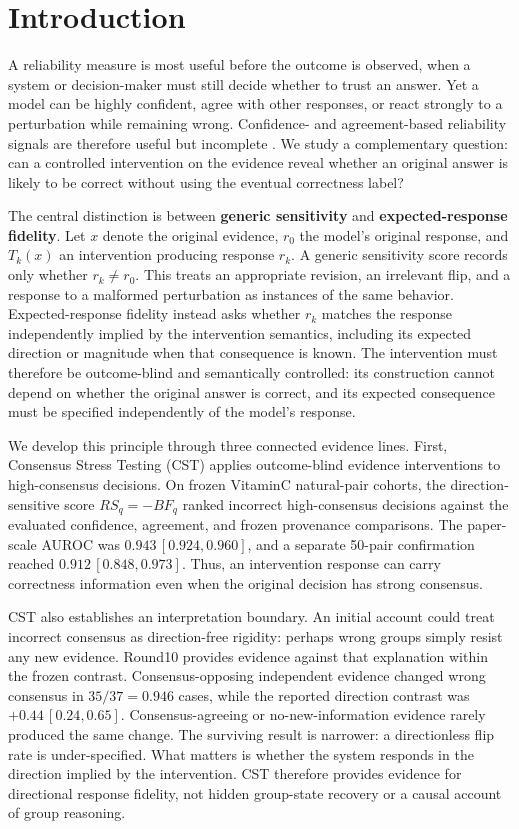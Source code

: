 \documentclass[11pt]{article}
\begin{document}
\section{Introduction}

A reliability measure is most useful before the outcome is observed, when a system or decision-maker must still decide whether to trust an answer. Yet a model can be highly confident, agree with other responses, or react strongly to a perturbation while remaining wrong. Confidence- and agreement-based reliability signals are therefore useful but incomplete \citep{guo-etal-2017-calibration,wang-etal-2022-self-consistency,kuhn-etal-2023-semantic-uncertainty}. We study a complementary question: can a controlled intervention on the evidence reveal whether an original answer is likely to be correct without using the eventual correctness label?

The central distinction is between \textbf{generic sensitivity} and \textbf{expected-response fidelity}. Let \(x\) denote the original evidence, \(r_0\) the model's original response, and \(T_k(x)\) an intervention producing response \(r_k\). A generic sensitivity score records only whether \(r_k\neq r_0\). This treats an appropriate revision, an irrelevant flip, and a response to a malformed perturbation as instances of the same behavior. Expected-response fidelity instead asks whether \(r_k\) matches the response independently implied by the intervention semantics, including its expected direction or magnitude when that consequence is known. The intervention must therefore be outcome-blind and semantically controlled: its construction cannot depend on whether the original answer is correct, and its expected consequence must be specified independently of the model's response.

We develop this principle through three connected evidence lines. First, Consensus Stress Testing (CST) applies outcome-blind evidence interventions to high-consensus decisions. On frozen VitaminC natural-pair cohorts, the direction-sensitive score \(RS_q=-BF_q\) ranked incorrect high-consensus decisions against the evaluated confidence, agreement, and frozen provenance comparisons. The paper-scale AUROC was \(0.943\,[0.924,0.960]\), and a separate 50-pair confirmation reached \(0.912\,[0.848,0.973]\). Thus, an intervention response can carry correctness information even when the original decision has strong consensus.

CST also establishes an interpretation boundary. An initial account could treat incorrect consensus as direction-free rigidity: perhaps wrong groups simply resist any new evidence. Round10 provides evidence against that explanation within the frozen contrast. Consensus-opposing independent evidence changed wrong consensus in \(35/37=0.946\) cases, while the reported direction contrast was \(+0.44\,[0.24,0.65]\). Consensus-agreeing or no-new-information evidence rarely produced the same change. The surviving result is narrower: a directionless flip rate is under-specified. What matters is whether the system responds in the direction implied by the intervention. CST therefore provides evidence for directional response fidelity, not hidden group-state recovery or a causal account of group reasoning.
\end{document}

